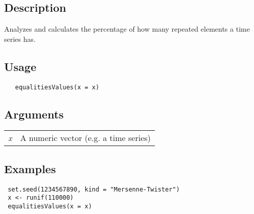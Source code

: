 \documentclass[12pt,letterpaper]{article}
\begin{document}
\vspace{-0.5cm}

\hrulefill  

\vspace{0.5cm}

\subsection*{Description}

Analyzes and calculates the percentage of how many repeated elements a time series has.

\vspace{0.5cm}

\subsection*{Usage}

\begin{lstlisting}
   equalitiesValues(x = x)
\end{lstlisting}

\vspace{0.5cm}

\subsection*{Arguments}

\begin{table}[!ht]
\begin{center}
\begin{tabularx}{\textwidth}{X X}
\hspace{0.5cm} \textit{x} & A numeric vector (e.g. a time series)\\
\end{tabularx}
\end{center}
\end{table} 

\subsection*{Examples}

\begin{lstlisting}
 set.seed(1234567890, kind = "Mersenne-Twister")
 x <- runif(110000)
 equalitiesValues(x = x)
\end{lstlisting}

\vspace{0.5cm}

\end{document}

